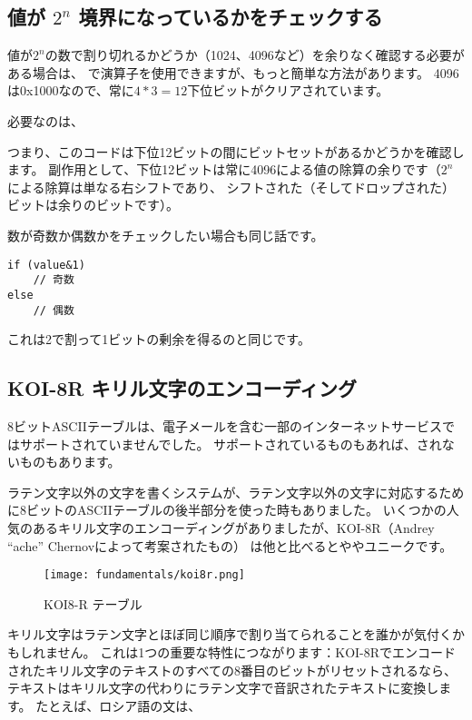 
\subsection{値が $2^n$ 境界になっているかをチェックする}

値が$2^n$の数で割り切れるかどうか（1024、4096など）を余りなく確認する必要がある場合は、 
\CCpp で\TT{\%}演算子を使用できますが、もっと簡単な方法があります。
4096は0x1000なので、常に$4*3=12$下位ビットがクリアされています。

必要なのは、



つまり、このコードは下位12ビットの間にビットセットがあるかどうかを確認します。
副作用として、下位12ビットは常に4096による値の除算の余りです（$2^n$による除算は単なる右シフトであり、
シフトされた（そしてドロップされた）ビットは余りのビットです）。

数が奇数か偶数かをチェックしたい場合も同じ話です。

\begin{lstlisting}[style=customc]
if (value&1)
	// 奇数
else
	// 偶数
\end{lstlisting}

これは2で割って1ビットの剰余を得るのと同じです。

\subsection{KOI-8R キリル文字のエンコーディング}

8ビット\ac{ASCII}テーブルは、電子メールを含む一部のインターネットサービスではサポートされていませんでした。
サポートされているものもあれば、されないものもあります。

ラテン文字以外の文字を書くシステムが、ラテン文字以外の文字に対応するために8ビットのASCIIテーブルの後半部分を使った時もありました。
いくつかの人気のあるキリル文字のエンコーディングがありましたが、KOI-8R（Andrey ``ache'' Chernovによって考案されたもの）
は他と比べるとややユニークです。

\begin{figure}[H]
\centering
\texttt{[image: fundamentals/koi8r.png]}
\caption{KOI8-R テーブル}
\end{figure}

キリル文字はラテン文字とほぼ同じ順序で割り当てられることを誰かが気付くかもしれません。
これは1つの重要な特性につながります：KOI-8Rでエンコードされたキリル文字のテキストのすべての8番目のビットがリセットされるなら、
テキストはキリル文字の代わりにラテン文字で音訳されたテキストに変換します。
たとえば、ロシア語の文は、

